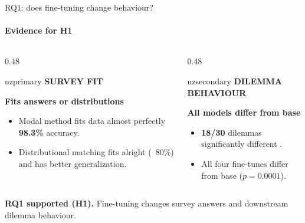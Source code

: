 \documentclass[aspectratio=169,11pt,t]{beamer}
\newcommand{\nzlabel}[1]{%
  {\sffamily\bfseries\fontsize{7}{8}\selectfont
   \color{nzsecondary}\MakeUppercase{#1}}}
\begin{document}
\begin{frame}{RQ1: does fine-tuning change behaviour?}
  \framesubtitle{Evidence for H1}
  \begin{columns}[T,onlytextwidth]
    \begin{column}{0.48\textwidth}
      \begin{nzcard}[left=3mm,right=3mm,top=2.5mm,bottom=2.5mm]{nzprimary}
        \nzlabel{Survey fit}\par\vspace{0.8mm}
        {\bfseries\normalsize Fits answers or distributions}\par
        \vspace{1.2mm}
        {\footnotesize
         \begin{itemize}
           \item Modal method fits data almost perfectly \textbf{98.3\%} accuracy.
           \item Distributional matching fits alright (~80\%) and has better generalization.
         \end{itemize}}
      \end{nzcard}
    \end{column}
    \hfill
    \pause
    \begin{column}{0.48\textwidth}
      \begin{nzcard}[left=3mm,right=3mm,top=2.5mm,bottom=2.5mm]{nzsecondary}
        \nzlabel{Dilemma behaviour}\par\vspace{0.8mm}
        {\bfseries\normalsize All models differ from base}\par
        \vspace{1.2mm}
        {\footnotesize
         \begin{itemize}
           \item \textbf{18/30} dilemmas significantly different .
           \item All four fine-tunes differ from base ($p=0.0001$).
         \end{itemize}}
      \end{nzcard}
    \end{column}
  \end{columns}
  \vspace{1.5mm}
  \pause
  {\small \textbf{RQ1 supported (H1).} Fine-tuning changes survey answers and
   downstream dilemma behaviour.}
\end{frame}
\end{document}

